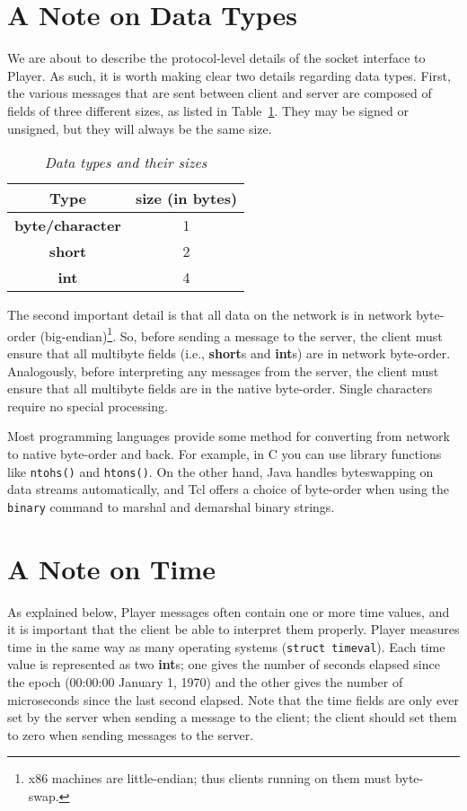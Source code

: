 \documentclass[11pt]{report}
\begin{document}
\section{A Note on Data Types}
We are about to describe the protocol-level details of the socket
interface to Player.  As such, it is worth making clear two details
regarding data types.  First, the various messages that are sent
between client and server are composed of fields of three different
sizes, as listed in Table~\ref{table:datatypes}.  They may be signed
or unsigned, but they will always be the same size.  

\begin{table}[ht]
\begin{center}
{\small
\begin{tabular}{|c|c|}
\hline
Type & size (in bytes) \\
\hline
{\bf byte/character} & 1 \\
\hline
{\bf short} & 2 \\
\hline
{\bf int} & 4 \\
\hline
\end{tabular}
}
\end{center}
\caption{{\em Data types and their sizes}}
\label{table:datatypes}
\end{table}

The second important detail is that all data on the network is in network
byte-order (big-endian)\footnote{x86 machines are little-endian;
thus clients running on them must byte-swap.}.  
So, before sending a message to the
server, the client must ensure that all multibyte fields 
(i.e., {\bf short}s and {\bf int}s)
are in network byte-order.  Analogously, before interpreting any messages
from the server, the client must ensure that all multibyte fields
are in the native byte-order.
Single characters require no special processing.

Most programming languages provide some method for converting from network 
to native byte-order and back.  For example, in C you can use library functions
like {\tt ntohs()} and {\tt htons()}.  On the other hand, Java handles
byteswapping on data streams automatically, and Tcl offers a choice of
byte-order when using the {\tt binary} command to marshal and demarshal binary
strings.

\section{A Note on Time}
As explained below, Player messages often contain one or more time values,
and it is important that the client be able to interpret them properly.
Player measures time in the same way as many operating systems 
({\tt struct timeval}).
Each time value is represented as two {\bf int}s; one gives the number
of seconds elapsed since the epoch (00:00:00 January 1, 1970) and the other
gives the number of microseconds since the last second elapsed.
Note that the time fields are only ever set by the server when sending
a message to the client; the client should set them to zero when
sending messages to the server.
\end{document}
